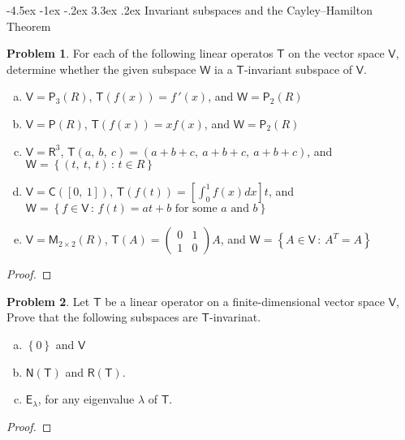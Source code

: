 \documentclass[12pt]{book}
\makeatletter
\theoremstyle{definition}
\newtheorem{problem}{Problem}
\renewcommand\chapter{\@startsection {chapter}{0}{\z@}%
	{-4.5ex \@plus -1ex \@minus -.2ex}%
	{3.3ex \@plus.2ex}%
	{\normalfont\LARGE\bfseries}}
\makeatother
\begin{document}
	\chapter{Invariant subspaces and the Cayley–Hamilton Theorem}
	\setcounter{problem}{1}
	\begin{problem}
		For each of the following linear operatos $\mathsf{T}$ on the vector space $\mathsf{V}$, determine whether the given subspace $\mathsf{W}$ ia a $\mathsf{T}$-invariant subspace of $\mathsf{V}$.
		\begin{enumerate}[(a)]
			\item $\mathsf{V}=\mathsf{P}_3(R)$, $\mathsf{T}(f(x))=f\,'(x)$, and $\mathsf{W}=\mathsf{P}_2(R)$
			\item $\mathsf{V}=\mathsf{P}(R)$, $\mathsf{T}(f(x))=xf(x)$, and $\mathsf{W}=\mathsf{P}_2(R)$
			\item $\mathsf{V}=\mathsf{R}^3$, $\mathsf{T}(a,~b,~c)=(a+b+c,~a+b+c,~a+b+c)$, and $\mathsf{W}=\left\{\left(t,~t,~t\right)\,:\,t\in R\right\}$
			\item $\mathsf{V}=\mathsf{C}([0,~1])$, $\mathsf{T}(f(t))=\left[\int_{0}^{1}f(x)dx\right]t$, and\\ $\mathsf{W}=\left\{f\in\mathsf{V}\,:\,f(t)=at+b\text{ for some } a\text{ and }b\right\}$
			\item $\mathsf{V}=\mathsf{M}_{2\times 2}(R)$, $\mathsf{T}(A)=\begin{pmatrix}
				0&1\\1&0
			\end{pmatrix}A$, and $\mathsf{W}=\left\{A\in\mathsf{V}\,:\,A^T=A\right\}$
		\end{enumerate}
	\end{problem}
	\begin{proof}
	\end{proof}
	\newpage
	\begin{problem}
		Let $\mathsf{T}$ be a linear operator on a finite-dimensional vector space $\mathsf{V}$, Prove that the following subspaces are $\mathsf{T}$-invarinat.
		\begin{enumerate}[(a)]
			\item $\left\{\mathit{0}\right\}$ and $\mathsf{V}$
			\item $\mathsf{N}(\mathsf{T})$ and $\mathsf{R}(\mathsf{T})$.
			\item $\mathsf{E}_\lambda$, for any eigenvalue $\lambda$ of $\mathsf{T}$.
		\end{enumerate}
	\end{problem}
	\begin{proof}
	\end{proof}
\end{document}
